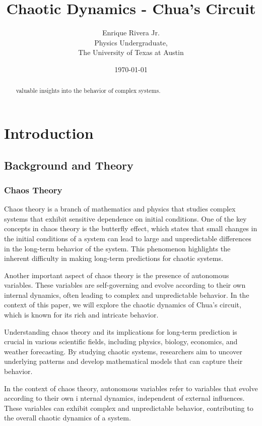 \documentclass[12pt]{article}
\title{Chaotic Dynamics - Chua's Circuit}
\author{Enrique Rivera Jr. \\
                Physics Undergraduate, \\ 
                The University of Texas at Austin}
\date{\today}
\begin{document}
\maketitle

\begin{abstract}
        valuable insights into the behavior of complex systems.
\end{abstract}

\section{Introduction}
        \subsection{Background and Theory}

                \subsubsection{Chaos Theory} 
                Chaos theory is a branch of mathematics and physics that studies complex systems that exhibit 
                sensitive dependence on initial conditions. One of the key concepts in chaos theory is the butterfly
                 effect, which states that small changes in the initial conditions of a system can lead to large and 
                 unpredictable differences in the long-term behavior of the system. This phenomenon highlights the inherent 
                 difficulty in making long-term predictions for chaotic systems.

                Another important aspect of chaos theory is the presence of autonomous variables. These variables are 
                self-governing and evolve according to their own internal dynamics, often leading to complex and unpredictable 
                behavior. In the context of this paper, we will explore the chaotic dynamics of Chua's circuit, which is known 
                for its rich and intricate behavior.

                Understanding chaos theory and its implications for long-term prediction is crucial in various scientific 
                fields, including physics, biology, economics, and weather forecasting. By studying chaotic systems, 
                researchers aim to uncover underlying patterns and develop mathematical models that can capture their behavior.

                In the context of chaos theory, autonomous variables refer to variables that evolve according to their own i
                nternal dynamics, independent of external influences. These variables can exhibit complex and unpredictable 
                behavior, contributing to the overall chaotic dynamics of a system.
\end{document}
